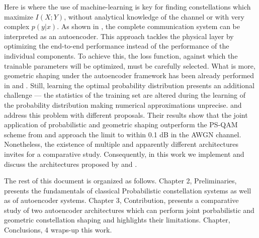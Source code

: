 Here is where the use of machine-learning is key for finding constellations which maximize $I(X;Y)$, without analytical knowledge of the channel or with very complex $p(y|x)$. As shown in \cite{O'Shea}, the complete communication system can be interpreted as an autoencoder. This approach tackles the physical layer by optimizing the end-to-end performance instead of the performance of the individual components. To achieve this, the loss function, against which the trainable parameters will be optimized, must be carefully selected. What is more, geometric shaping under the autoencoder framework has been already performed in \cite{O'Shea} and \cite{Jones}. Still, learning the optimal probability distribution presents an additional challenge --- the statistics of the training set are altered during the learning of the probability distribution making numerical approximations unprecise. \cite{Stark} and \cite{Aref} address this problem with different proposals. Their results show that the joint application of probabilistic and geometric shaping outperform the PS-QAM scheme from \cite{Boecherer} and approach the limit to within 0.1 dB in the AWGN channel. Nonetheless, the existence of multiple and apparently different architectures invites for a comparative study. Consequently, in this work we implement and discuss the architectures proposed by \cite{Stark} and \cite{Aref}.

The rest of this document is organized as follows. Chapter 2, Preliminaries, presents the fundamentals of classical Probabilistic constellation systems as well as of autoencoder systems. Chapter 3, Contribution, presents a comparative study of two autoencoder architectures which can perform joint porbabilistic and geometric constellation shaping and highlights their limitations. Chapter, Conclusions, 4 wraps-up this work.
